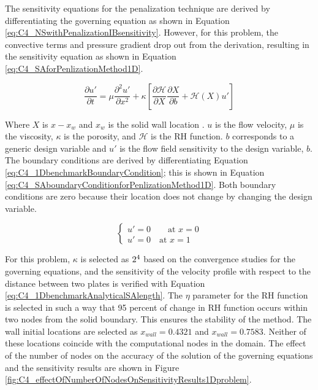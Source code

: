 The sensitivity equations for the penalization technique are derived by differentiating the governing equation as shown in Equation \eqref{eq:C4_NSwithPenalizationIBsensitivity}. However, for this problem, the convective terms and pressure gradient drop out from the derivation, resulting in the sensitivity equation as shown in Equation \eqref{eq:C4_SAforPenlizationMethod1D}.

\begin{equation}\label{eq:C4_SAforPenlizationMethod1D}
    \frac{\partial u'}{\partial t} = 
    \mu \frac{\partial^2 u'}{\partial x^2} +
    \kappa \left[
    \frac{\partial \mathcal{H}}{\partial X} \frac{\partial X}{\partial b} + 
    \mathcal{H}(X) u'
    \right]
\end{equation}

Where $X$ is $x - x_w$ and $x_w$ is the solid wall location . $u$ is the flow velocity, $\mu$ is the viscosity, $\kappa$ is the porosity, and $\mathcal{H}$ is the RH function. $b$ corresponds to a generic design variable and $u'$ is the flow field sensitivity to the design variable, $b$. The boundary conditions are derived by differentiating Equation \eqref{eq:C4_1DbenchmarkBoundaryCondition}; this is shown in Equation \eqref{eq:C4_SAboundaryConditionforPenlizationMethod1D}. Both boundary conditions are zero because their location does not change by changing the design variable.

\begin{equation}\label{eq:C4_SAboundaryConditionforPenlizationMethod1D}
\begin{cases}
    u' = 0 \qquad \text{at } x = 0 \\
    u' = 0 \quad \text{at } x = 1
\end{cases}
\end{equation}

For this problem, $\kappa$ is selected as $2 \time 10^4$ based on the convergence studies for the governing equations, and the sensitivity of the velocity profile with respect to the distance between two plates is verified with Equation \eqref{eq:C4_1DbenchmarkAnalyticalSAlength}. The $\eta$ parameter for the RH function is selected in such a way that 95 percent of change in RH function occurs within two nodes from the solid boundary. This ensures the stability of the method. The wall initial locations are selected as $x_{wall} = 0.4321$ and $x_{wall} = 0.7583$. Neither of these locations coincide with the computational nodes in the domain. The effect of the number of nodes on the accuracy of the solution of the governing equations and the sensitivity results are shown in Figure \ref{fig:C4_effectOfNumberOfNodesOnSensitivityResults1Dproblem}.

